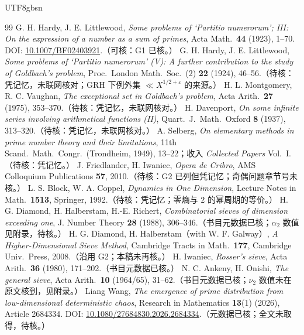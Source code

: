 \documentclass[11pt,a4paper]{article}
\theoremstyle{plain}
\theoremstyle{definition}
\begin{document}
\begin{CJK}{UTF8}{gbsn}
\begin{thebibliography}{99}
 G. H. Hardy, J. E. Littlewood, \emph{Some problems of `Partitio numerorum'; III: On the expression of a number as a sum of primes},
Acta Math.\ \textbf{44} (1923), 1--70. DOI: \url{10.1007/BF02403921}.（可核：G1 已核。）
 G. H. Hardy, J. E. Littlewood, \emph{Some problems of `Partitio numerorum' (V): A further contribution to the study of Goldbach's problem},
Proc.\ London Math.\ Soc.\ (2) \textbf{22} (1924), 46--56.（待核：凭记忆，未联网核对；GRH 下例外集 $\ll X^{1/2+\varepsilon}$ 的来源。）
 H. L. Montgomery, R. C. Vaughan, \emph{The exceptional set in Goldbach's problem}, Acta Arith.\ \textbf{27} (1975), 353--370.（待核：凭记忆，未联网核对。）
 H. Davenport, \emph{On some infinite series involving arithmetical functions (II)}, Quart.\ J.\ Math.\ Oxford \textbf{8} (1937), 313--320.（待核：凭记忆，未联网核对。）
 A. Selberg, \emph{On elementary methods in prime number theory and their limitations}, 11th Scand.\ Math.\ Congr.\ (Trondheim, 1949), 13--22；收入 \emph{Collected Papers} Vol.\ I.（待核：凭记忆。）
 J. Friedlander, H. Iwaniec, \emph{Opera de Cribro}, AMS Colloquium Publications \textbf{57}, 2010.（待核：G2 已列但凭记忆；奇偶问题章节号未核。）
 L. S. Block, W. A. Coppel, \emph{Dynamics in One Dimension}, Lecture Notes in Math.\ \textbf{1513}, Springer, 1992.（待核：凭记忆；零熵与 $2$ 的幂周期的等价。）
 H. G. Diamond, H. Halberstam, H.-E. Richert, \emph{Combinatorial sieves of dimension exceeding one}, J. Number Theory \textbf{28} (1988), 306--346.（书目元数据已核；$\alpha_2$ 数值见附录，待核。）
 H. G. Diamond, H. Halberstam（with W. F. Galway）, \emph{A Higher-Dimensional Sieve Method}, Cambridge Tracts in Math.\ \textbf{177}, Cambridge Univ.\ Press, 2008.（沿用 G2；本稿未再核。）
 H. Iwaniec, \emph{Rosser's sieve}, Acta Arith.\ \textbf{36} (1980), 171--202.（书目元数据已核。）
 N. C. Ankeny, H. Onishi, \emph{The general sieve}, Acta Arith.\ \textbf{10} (1964/65), 31--62.（书目元数据已核；$\nu_2$ 数值未在原文核到，见附录。）
 Liang Wang, \emph{The emergence of prime distribution from low-dimensional deterministic chaos},
Research in Mathematics \textbf{13}(1) (2026), Article 2684334. DOI: \url{10.1080/27684830.2026.2684334}.（元数据已核；全文未取得，待核。）
\end{thebibliography}

\end{CJK}
\end{document}
